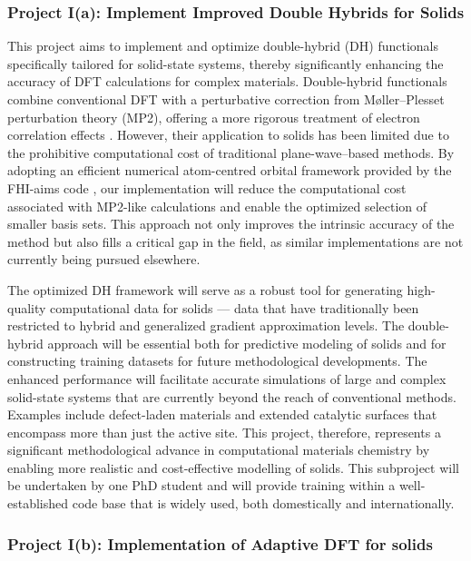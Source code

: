 \documentclass[11pt,english,calcwidth,compact]{nserc-appendix}
\begin{document}
\subsubsection*{Project I(a): Implement Improved Double Hybrids for Solids}  

This project aims to implement and optimize double-hybrid (DH) functionals \cite{dh23} specifically tailored for solid-state systems, thereby significantly enhancing the accuracy of DFT calculations for complex materials. Double-hybrid functionals combine conventional DFT with a perturbative correction from Møller–Plesset perturbation theory (MP2), offering a more rigorous treatment of electron correlation effects \cite{dh1,dh2}. However, their application to solids has been limited due to the prohibitive computational cost of traditional plane-wave–based methods. By adopting an efficient numerical atom-centred orbital framework provided by the FHI-aims code \cite{fhiaims,fhiaimshybrid}, our implementation will reduce the computational cost associated with MP2-like calculations and enable the optimized selection of smaller basis sets. This approach not only improves the intrinsic accuracy of the method but also fills a critical gap in the field, as similar implementations are not currently being pursued elsewhere.

The optimized DH framework will serve as a robust tool for generating high-quality computational data for solids --- data that have traditionally been restricted to hybrid and generalized gradient approximation levels. The double-hybrid approach will be essential both for predictive modeling of solids and for constructing training datasets for future methodological developments. The enhanced performance will facilitate accurate simulations of large and complex solid-state systems that are currently beyond the reach of conventional methods. Examples include defect-laden materials and extended catalytic surfaces that encompass more than just the active site. This project, therefore, represents a significant methodological advance in computational materials chemistry by enabling more realistic and cost-effective modelling of solids. This subproject will be undertaken by one PhD student and will provide training within a well-established code base that is widely used, both domestically and internationally. 

\subsubsection*{Project I(b): Implementation of Adaptive DFT for solids}  
\end{document}
